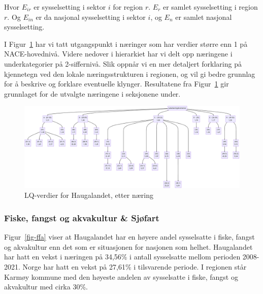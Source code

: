 \documentclass[
]{article}
\begin{document}
Hvor \(E_{ir}\) er sysselsetting i sektor \(i\) for region \(r\).
\(E_r\) er samlet sysselsetting i region \(r\). Og \(E_{in}\) er da
nasjonal sysselsetting i sektor \(i\), og \(E_n\) er samlet nasjonal
sysselsetting.

I Figur~\ref{fig-loq} har vi tatt utgangspunkt i næringer som har
verdier større enn 1 på NACE-hovednivå. Videre nedover i hierarkiet har
vi delt opp næringene i underkategorier på 2-siffernivå. Slik oppnår vi
en mer detaljert forklaring på kjennetegn ved den lokale
næringsstrukturen i regionen, og vil gi bedre grunnlag for å beskrive og
forklare eventuelle klynger. Resultatene fra Figur~\ref{fig-loq} gir
grunnlaget for de utvalgte næringene i seksjonene under.

\begin{figure}[H]

{\centering \includegraphics{bilder/LQ-hierarki.png}

}

\caption{\label{fig-loq}LQ-verdier for Haugalandet, etter næring}

\end{figure}

\hypertarget{fiske-fangst-og-akvakultur-sjuxf8fart}{%
\subsubsection{Fiske, fangst og akvakultur \&
Sjøfart}\label{fiske-fangst-og-akvakultur-sjuxf8fart}}

Figur~\ref{fig-ffa} viser at Haugalandet har en høyere andel sysselsatte
i fiske, fangst og akvakultur enn det som er situasjonen for nasjonen
som helhet. Haugalandet har hatt en vekst i næringen på 34,56\% i antall
sysselsatte mellom perioden 2008-2021. Norge har hatt en vekst på
27,61\% i tilsvarende periode. I regionen står Karmøy kommune med den
høyeste andelen av sysselsatte i fiske, fangst og akvakultur med cirka
30\%.
\end{document}
